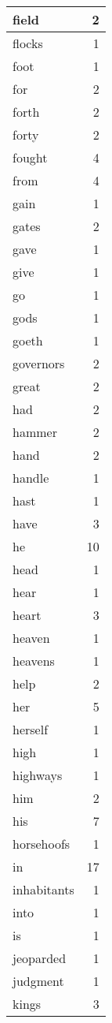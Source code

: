 \begin{center}
\begin{longtable}{l|r}
field & 2\\ \hline 
flocks & 1\\ \hline 
foot & 1\\ \hline 
for & 2\\ \hline 
forth & 2\\ \hline 
forty & 2\\ \hline 
fought & 4\\ \hline 
from & 4\\ \hline 
gain & 1\\ \hline 
gates & 2\\ \hline 
gave & 1\\ \hline 
give & 1\\ \hline 
go & 1\\ \hline 
gods & 1\\ \hline 
goeth & 1\\ \hline 
governors & 2\\ \hline 
great & 2\\ \hline 
had & 2\\ \hline 
hammer & 2\\ \hline 
hand & 2\\ \hline 
handle & 1\\ \hline 
hast & 1\\ \hline 
have & 3\\ \hline 
he & 10\\ \hline 
head & 1\\ \hline 
hear & 1\\ \hline 
heart & 3\\ \hline 
heaven & 1\\ \hline 
heavens & 1\\ \hline 
help & 2\\ \hline 
her & 5\\ \hline 
herself & 1\\ \hline 
high & 1\\ \hline 
highways & 1\\ \hline 
him & 2\\ \hline 
his & 7\\ \hline 
horsehoofs & 1\\ \hline 
in & 17\\ \hline 
inhabitants & 1\\ \hline 
into & 1\\ \hline 
is & 1\\ \hline 
jeoparded & 1\\ \hline 
judgment & 1\\ \hline 
kings & 3\\ \hline 

\end{longtable}
\end{center}
